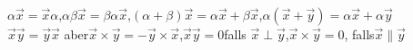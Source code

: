 \documentclass{article}
\begin{document}
$\alpha\vec{x} = \vec{x}\alpha$,\hfill$\alpha\beta\vec{x}
= \beta\alpha\vec{x}$,\hfill$(\alpha + \beta)\vec{x} = \alpha\vec{x} +
\beta\vec{x}$,\hfill $\alpha(\vec{x} + \vec{y})
= \alpha\vec{x} + \alpha\vec{y}$\\
\hspace*{1.5em}$\vec{x}\vec{y} = \vec{y}\vec{x}$\hfill
aber\hfill$\vec{x}\times\vec{y} =
-\vec{y}\times\vec{x}$,\hfill\hfill$\vec{x}\vec{y} = 0$\hfill falls\hfill%
$\vec{x}\perp\vec{y}$,\hfill\hfill$\vec{x}\times\vec{y} = 0$,\hfill
falls\hfill$\vec{x}\parallel\vec{y}$
\end{document}
